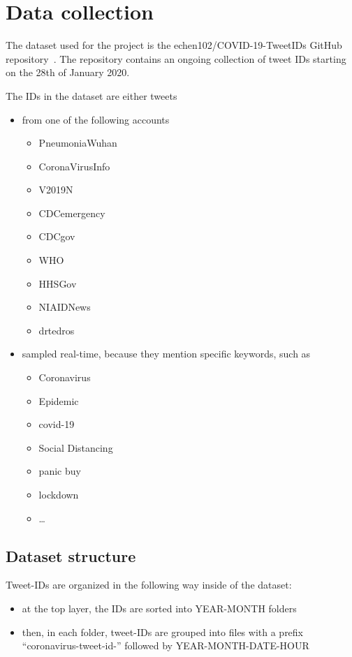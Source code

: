 \chapter{Data collection}
\label{cha:data}
The dataset used for the project is the echen102/COVID-19-TweetIDs GitHub repository~\cite{chen2020tracking}. The repository contains an ongoing collection of tweet IDs starting on the 28th of January 2020.

The IDs in the dataset are either tweets
\begin{itemize}
	\item from one of the following accounts
	\begin{itemize}
		\item PneumoniaWuhan
		\item CoronaVirusInfo
		\item V2019N
		\item CDCemergency
		\item CDCgov
		\item WHO
		\item HHSGov
		\item NIAIDNews
		\item drtedros
	\end{itemize}
	\item sampled real-time, because they mention specific keywords, such as
	\begin{itemize}
		\item Coronavirus
		\item Epidemic
		\item covid-19
		\item Social Distancing
		\item panic buy
		\item lockdown
		\item \ldots
	\end{itemize}
\end{itemize}

\section{Dataset structure}
\label{sec:dataset-struct}

Tweet-IDs are organized in the following way inside of the dataset:

\begin{itemize}
	\item at the top layer, the IDs are sorted into YEAR-MONTH folders
	\item then, in each folder, tweet-IDs are grouped into files with a prefix “coronavirus-tweet-id-” followed by YEAR-MONTH-DATE-HOUR
\end{itemize}


